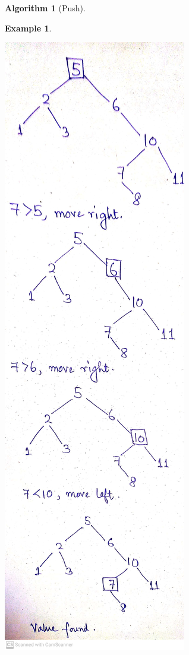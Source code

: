 \documentclass[10pt, a4paper]{extarticle}
\theoremstyle{definition}
\newtheorem{alg}{Algorithm}
\newtheorem{eg}{Example}
\begin{document}
\begin{alg}[Push]
\begin{eg}
\begin{center}
			\includegraphics[scale=0.1]{bst2.jpg}\\
		\end{center}
	\end{eg}

\end{alg}
\end{document}
